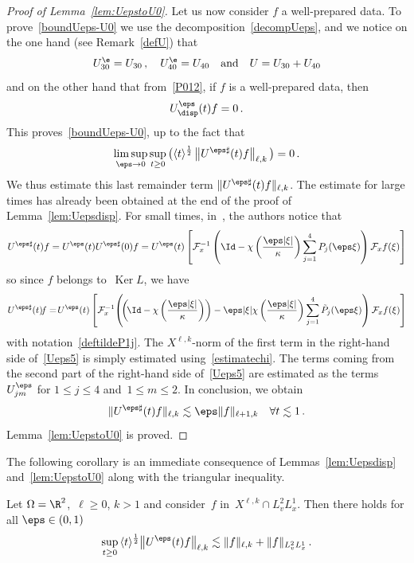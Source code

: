\begin{proof}[Proof of Lemma~\ref{lem:UepstoU0}]
Let us now consider $f$ a well-prepared data. To prove~\eqref{boundUeps-U0} we use the decomposition~\eqref{decompUeps}, and we notice on the one hand (see Remark~\ref{defU}) that
\[
U^\e_{30} = U_{30} \,, \quad U^\e_{40}=
U_{40}\quad \text{and}\quad U = U_{30}+U_{40}
\]
and on the other hand that from~\eqref{P012}, if $f$ is a well-prepared data, then
\[
U^\eps_{\disp}(t) f=0\,.
\]
This proves~\eqref{boundUeps-U0}, up to the fact that
\[
\limsup_{\eps\to0} \sup_{t \ge 0} \big(\langle t \rangle^{\frac12} \left\|U^{\eps \sharp}(t) f \right\|_{\ell,k} \big)= 0 \,.
\]
We thus estimate this last remainder term $\|U^{\eps \sharp}(t) f\|_{\ell,k}$. The estimate for large times has already been obtained at the end of the proof of Lemma~\ref{lem:Uepsdisp}. For small times, in~\cite[Lemma~6.2]{Bardos-Ukai}, the authors notice that
\[
U^{\eps \sharp}(t)f = U^\eps(t)U^{\eps \sharp}(0) f= U^\eps(t) \left[\mathcal{F}_x^{-1} \left({\Id}-\chi\left(\frac{\eps|\xi|}\kappa\right)\sum_{j=1}^4 P_j(\eps\xi)\right) \mathcal{F}_x{f (\xi)} \right]
\]
so since $f$ belongs to~$ \operatorname{Ker} L$, we have
\begin{equation}\label{Ueps5}
U^{\eps \sharp}(t)\!f =\!U^\eps(t) \left[\mathcal{F}_x^{-1}\!\left(\!\left(\!{\Id}-\chi\left(\frac{\eps|\xi|}\kappa\right)\right) - \eps |\xi| \chi\left(\frac{\eps|\xi|}\kappa\right) \sum_{j=1}^4 \tilde P_{j} (\eps \xi)\right) \mathcal{F}_x{f (\xi)}\right]
\end{equation}
with notation~\eqref{deftildeP1j}. The $X^{\ell,k}$-norm of the first term in the right-hand side of~\eqref{Ueps5} is simply estimated using~\eqref{estimatechi}. The terms coming from the second part of the right-hand side of~\eqref{Ueps5} are estimated as the terms $U^\eps_{jm}$ for $1 \le j \le 4$ and~$1 \leq m \leq 2$. In conclusion, we obtain
\[
\|U^{\eps \sharp}(t)f\|_{\ell,k} \lesssim \eps \| f\|_{\ell+1,k}\quad \forall t \lesssim 1 \,.
\]
Lemma~\ref{lem:UepstoU0} is proved.
\end{proof}

The following corollary is an immediate consequence of Lemmas~\ref{lem:Uepsdisp} and~\ref{lem:UepstoU0} along with the triangular inequality.

\begin{coro}\label{estimateUepsd=2}
Let $\Omega = \R^2$,~$\ell \ge0$, ${k>1}$ and consider~$f$ in~$X^{\ell,k} \cap L^{2}_v L^1_x$. Then there holds for all $\eps \in (0,1)$
\[
\sup_{t \ge 0} \, \langle t \rangle^{\frac12} \big\| U^\eps (t)f\big \|_{\ell,k} \lesssim \|f\|_{\ell,k} + \|f\|_{L^{2}_v L^1_x} \,.
\]
\end{coro}


